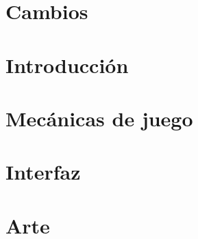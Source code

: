 \documentclass[16pt,spanish]{article}
\title{\titlename}
\author{\authorname}
\def \plpath{../plantilla}
\begin{document}




\tableofcontents
\cleardoublepage







\section{Cambios}
\label{sec:cambios}

\clearpage


\section{Introducción}
\label{sec:introduccion}

\clearpage

\section{Mecánicas de juego}
\label{sec:mecanicas}

\clearpage

\section{Interfaz}
\label{sec:interfaz}

\clearpage

\section{Arte}
\label{sec:arte}

\end{document}
